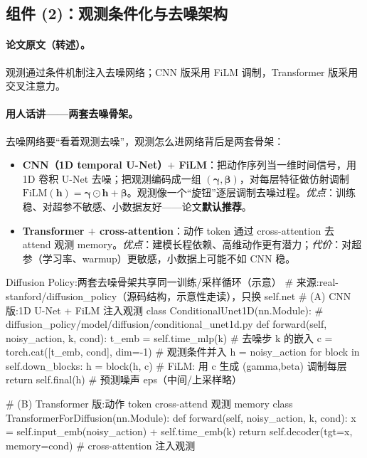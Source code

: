 \subsection{组件 (2)：观测条件化与去噪架构}
\label{sec:de-condition}

\paragraph{论文原文（转述）。}
观测通过条件机制注入去噪网络；CNN 版采用 FiLM 调制，Transformer 版采用交叉注意力\cite{chi2023diffusion}。

\paragraph{用人话讲——两套去噪骨架。}
去噪网络要“看着观测去噪”，观测怎么进网络背后是两套骨架：
\begin{itemize}
  \item \textbf{CNN（1D temporal U-Net）$+$ FiLM}：把动作序列当一维时间信号，用 1D 卷积 U-Net 去噪；把观测编码成一组 $(\boldsymbol{\gamma},\boldsymbol{\beta})$，对每层特征做仿射调制 $\mathrm{FiLM}(\mathbf{h})=\boldsymbol{\gamma}\odot\mathbf{h}+\boldsymbol{\beta}$。观测像一个“旋钮”逐层调制去噪过程。\emph{优点}：训练稳、对超参不敏感、小数据友好——论文\textbf{默认推荐}。
  \item \textbf{Transformer $+$ cross-attention}：动作 token 通过 cross-attention 去 attend 观测 memory。\emph{优点}：建模长程依赖、高维动作更有潜力；\emph{代价}：对超参（学习率、warmup）更敏感，小数据上可能不如 CNN 稳。
\end{itemize}

\begin{codebox}[Python]{Diffusion Policy:两套去噪骨架共享同一训练/采样循环（示意）}
# 来源:real-stanford/diffusion_policy（源码结构，示意性走读），只换 self.net
# (A) CNN 版:1D U-Net + FiLM 注入观测
class ConditionalUnet1D(nn.Module):       # diffusion_policy/model/diffusion/conditional_unet1d.py
    def forward(self, noisy_action, k, cond):
        t_emb = self.time_mlp(k)               # 去噪步 k 的嵌入
        c = torch.cat([t_emb, cond], dim=-1)   # 观测条件并入
        h = noisy_action
        for block in self.down_blocks:
            h = block(h, c)                    # FiLM: 用 c 生成 (gamma,beta) 调制每层
        return self.final(h)                   # 预测噪声 eps（中间/上采样略）

# (B) Transformer 版:动作 token cross-attend 观测 memory
class TransformerForDiffusion(nn.Module):
    def forward(self, noisy_action, k, cond):
        x = self.input_emb(noisy_action) + self.time_emb(k)
        return self.decoder(tgt=x, memory=cond)  # cross-attention 注入观测
\end{codebox}

